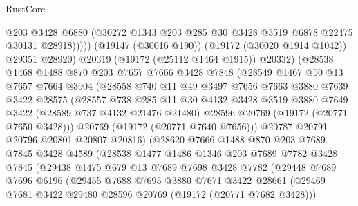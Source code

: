 \begin{lexlean}{RustCore}
\begin{coremodule}
                        @203
                        @3428
                        @6880
                        (@30272 @1343 @203 @285 @30 @3428 @3519 @6878 @22475 @30131 @28918)))))
                (@19147 (@30016 @190))
                (@19172 (@30020 @1914 @1042))
                @29351
                @28920)
              @20319
              (@19172 (@25112 @1464 @1915))
              @20332)
            (@28538
              @1468
              @1488
              @870
              @203
              @7657
              @7666
              @3428
              @7848
              (@28549
                @1467
                @50
                @13
                @7657
                @7664
                @3904
                (@28558
                  @740
                  @11
                  @49
                  @3497
                  @7656
                  @7663
                  @3880
                  @7639
                  @3422
                  @28575
                  (@28557
                    @738
                    @285
                    @11
                    @30
                    @4132
                    @3428
                    @3519
                    @3880
                    @7649
                    @3422
                    (@28589 @737 @4132 @21476 @21480)
                    @28596
                    @20769
                    (@19172 (@20771 @7650 @3428)))
                  @20769
                  (@19172 (@20771 @7640 @7656)))
                @20787
                @20791
                @20796
                @20801
                @20807
                @20816)
              (@28620
                @7666
                @1488
                @870
                @203
                @7689
                @7845
                @3428
                @4589
                (@28538
                  @1477
                  @1486
                  @1346
                  @203
                  @7689
                  @7782
                  @3428
                  @7845
                  (@29438
                    @1475
                    @679
                    @13
                    @7689
                    @7698
                    @3428
                    @7782
                    (@29448
                      @7689
                      @7696
                      @6196
                      (@29455
                        @7688
                        @7695
                        @3880
                        @7671
                        @3422
                        @28661
                        (@29469 @7681 @3422 @29480 @28596 @20769 (@19172 (@20771 @7682 @3428)))

\end{coremodule}
\end{lexlean}
